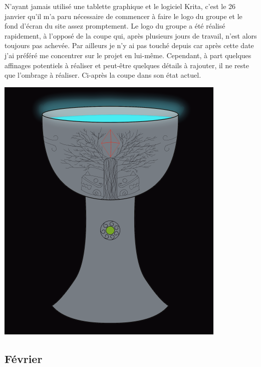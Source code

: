 \documentclass[]{extarticle}
\begin{document}
\begin{spacing}{1.25}
\bigbreak
\bigbreak
N’ayant jamais utilisé une tablette graphique et le logiciel Krita, c'est le 26 janvier qu'il m'a paru nécessaire de commencer à faire le logo du groupe et le fond d'écran du site assez promptement. Le logo du groupe a été réalisé rapidement, à l'opposé de la coupe qui, après plusieurs jours de travail, n'est alors toujours pas achevée. Par ailleurs je n’y ai pas touché depuis car après cette date j'ai préféré me concentrer sur le projet en lui-même. Cependant, à part quelques affinages potentiels à réaliser et peut-être quelques détails à rajouter, il ne reste que l'ombrage à réaliser. Ci-après la coupe dans son état actuel. 
\bigbreak
\begin{center}
\includegraphics[scale = 0.3]{coupe.png}
\end{center}

\newpage

\subsection{Février}


\end{spacing}
\end{document}
